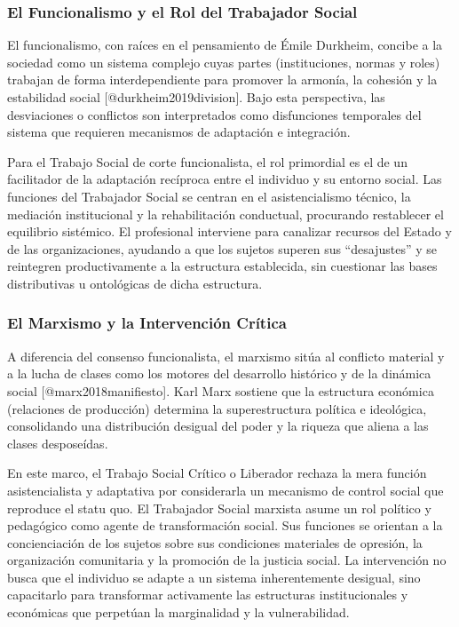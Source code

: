 \documentclass[12pt,spanish]{article}
\begin{document}
\subsubsection{El Funcionalismo y el Rol del Trabajador
Social}\label{el-funcionalismo-y-el-rol-del-trabajador-social}

El funcionalismo, con raíces en el pensamiento de Émile Durkheim,
concibe a la sociedad como un sistema complejo cuyas partes
(instituciones, normas y roles) trabajan de forma interdependiente para
promover la armonía, la cohesión y la estabilidad social
{[}@durkheim2019division{]}. Bajo esta perspectiva, las desviaciones o
conflictos son interpretados como disfunciones temporales del sistema
que requieren mecanismos de adaptación e integración.

Para el Trabajo Social de corte funcionalista, el rol primordial es el
de un facilitador de la adaptación recíproca entre el individuo y su
entorno social. Las funciones del Trabajador Social se centran en el
asistencialismo técnico, la mediación institucional y la rehabilitación
conductual, procurando restablecer el equilibrio sistémico. El
profesional interviene para canalizar recursos del Estado y de las
organizaciones, ayudando a que los sujetos superen sus ``desajustes'' y
se reintegren productivamente a la estructura establecida, sin
cuestionar las bases distributivas u ontológicas de dicha estructura.

\subsubsection{El Marxismo y la Intervención
Crítica}\label{el-marxismo-y-la-intervenciuxf3n-cruxedtica}

A diferencia del consenso funcionalista, el marxismo sitúa al conflicto
material y a la lucha de clases como los motores del desarrollo
histórico y de la dinámica social {[}@marx2018manifiesto{]}. Karl Marx
sostiene que la estructura económica (relaciones de producción)
determina la superestructura política e ideológica, consolidando una
distribución desigual del poder y la riqueza que aliena a las clases
desposeídas.

En este marco, el Trabajo Social Crítico o Liberador rechaza la mera
función asistencialista y adaptativa por considerarla un mecanismo de
control social que reproduce el statu quo. El Trabajador Social marxista
asume un rol político y pedagógico como agente de transformación social.
Sus funciones se orientan a la concienciación de los sujetos sobre sus
condiciones materiales de opresión, la organización comunitaria y la
promoción de la justicia social. La intervención no busca que el
individuo se adapte a un sistema inherentemente desigual, sino
capacitarlo para transformar activamente las estructuras institucionales
y económicas que perpetúan la marginalidad y la vulnerabilidad.
\end{document}
